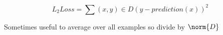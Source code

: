 \documentclass{article}
\begin{document}
\begin{equation}
    L_2Loss = \sum{(x,y) \in D} (y - prediction(x))^2
\end{equation}

Sometimes useful to average over all examples so divide by $\norm{D}$
\end{document}
